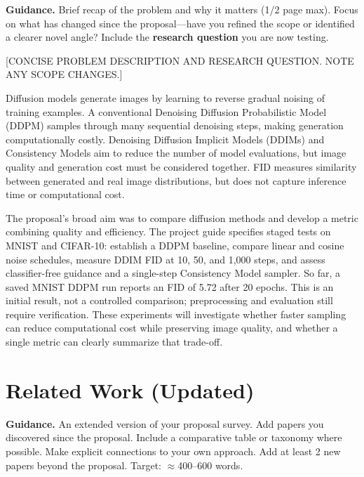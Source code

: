 \documentclass[11pt, letterpaper]{article}
\begin{document}
\begin{guidancebox}
\textbf{Guidance.} Brief recap of the problem and why it matters (1/2 page max).
Focus on what has changed since the proposal---have you refined the scope or identified
a clearer novel angle? Include the \textbf{research question} you are now testing.
\end{guidancebox}

[CONCISE PROBLEM DESCRIPTION AND RESEARCH QUESTION. NOTE ANY SCOPE CHANGES.]

Diffusion models generate images by learning to reverse gradual noising of training examples. A conventional Denoising Diffusion Probabilistic Model (DDPM) samples through many sequential denoising steps, making generation computationally costly. Denoising Diffusion Implicit Models (DDIMs) and Consistency Models aim to reduce the number of model evaluations, but image quality and generation cost must be considered together. FID measures similarity between generated and real image distributions, but does not capture inference time or computational cost.

The proposal's broad aim was to compare diffusion methods and develop a metric combining quality and efficiency. The project guide specifies staged tests on MNIST and CIFAR-10: establish a DDPM baseline, compare linear and cosine noise schedules, measure DDIM FID at 10, 50, and 1,000 steps, and assess classifier-free guidance and a single-step Consistency Model sampler. So far, a saved MNIST DDPM run reports an FID of 5.72 after 20 epochs. This is an initial result, not a controlled comparison; preprocessing and evaluation still require verification. These experiments will investigate whether faster sampling can reduce computational cost while preserving image quality, and whether a single metric can clearly summarize that trade-off.

\section{Related Work (Updated)}

\begin{guidancebox}
\textbf{Guidance.} An extended version of your proposal survey. Add papers you
discovered since the proposal. Include a comparative table or taxonomy where possible.
Make explicit connections to your own approach. Add at least 2 new papers beyond
the proposal. Target: $\approx$400--600 words.
\end{guidancebox}
\end{document}
